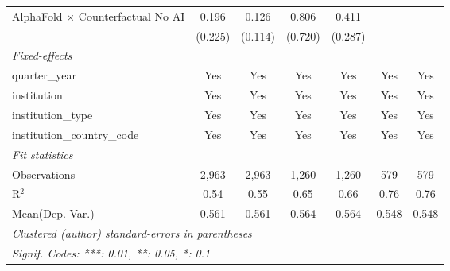 \begin{tabular}{lcccccc}
   AlphaFold $\times$ Counterfactual No AI  & 0.196   & 0.126         & 0.806   & 0.411        &         &   \\   
                                            & (0.225) & (0.114)       & (0.720) & (0.287)      &         &   \\   
   \midrule
   \emph{Fixed-effects}\\
   quarter\_year                            & Yes     & Yes           & Yes     & Yes          & Yes     & Yes\\  
   institution                              & Yes     & Yes           & Yes     & Yes          & Yes     & Yes\\  
   institution\_type                        & Yes     & Yes           & Yes     & Yes          & Yes     & Yes\\  
   institution\_country\_code               & Yes     & Yes           & Yes     & Yes          & Yes     & Yes\\  
   \midrule
   \emph{Fit statistics}\\
   Observations                             & 2,963   & 2,963         & 1,260   & 1,260        & 579     & 579\\  
   R$^2$                                    & 0.54    & 0.55          & 0.65    & 0.66         & 0.76    & 0.76\\  
Mean(Dep. Var.) & 0.561 & 0.561 & 0.564 & 0.564 & 0.548 & 0.548 \\
   \midrule \midrule
   \multicolumn{7}{l}{\emph{Clustered (author) standard-errors in parentheses}}\\
   \multicolumn{7}{l}{\emph{Signif. Codes: ***: 0.01, **: 0.05, *: 0.1}}\\
\end{tabular}
\par\endgroup
